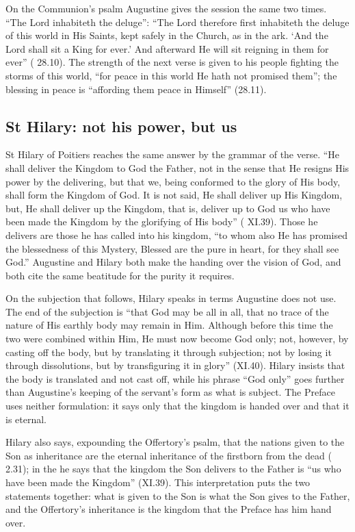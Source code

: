 On the Communion's psalm Augustine gives the session the same two times.
``The Lord inhabiteth the deluge'': ``The Lord therefore first inhabiteth the
deluge of this world in His Saints, kept safely in the Church, as in the ark.
`And the Lord shall sit a King for ever.' And afterward He will sit reigning in
them for ever'' ( 28.10). The strength of the
next verse is given to his people fighting the storms of this world, ``for
peace in this world He hath not promised them''; the blessing in peace is
``affording them peace in Himself'' (28.11).

\subsection{St Hilary: not his power, but us}
\label{sec:handed-hilary}

St Hilary of Poitiers reaches the same answer by the grammar of the verse.
``He shall deliver the Kingdom to God the Father, not in the sense that He
resigns His power by the delivering, but that we, being conformed to the glory
of His body, shall form the Kingdom of God. It is not said, He shall deliver up
His Kingdom, but, He shall deliver up the Kingdom, that is, deliver up to God
us who have been made the Kingdom by the glorifying of His body'' ( XI.39). Those he delivers are those he has called into his kingdom,
``to whom also He has promised the blessedness of this Mystery, Blessed are the
pure in heart, for they shall see God.'' Augustine and Hilary both
make the handing over the vision of God, and both cite the same beatitude for
the purity it requires.

On the subjection that follows, Hilary speaks in terms Augustine does not use.
The end of the subjection is ``that God may be all in all, that no trace of the
nature of His earthly body may remain in Him. Although before this time the two
were combined within Him, He must now become God only; not, however, by casting
off the body, but by translating it through subjection; not by losing it
through dissolutions, but by transfiguring it in glory'' (XI.40). Hilary insists
that the body is translated and not cast off, while his phrase ``God only'' goes
further than Augustine's keeping of the servant's form as what is subject.
The Preface uses neither formulation: it says only that the kingdom is handed
over and that it is eternal.

Hilary also says, expounding the Offertory's psalm, that the nations given to
the Son as inheritance are the eternal inheritance of the firstborn from the
dead ( 2.31); in the  he says
that the kingdom the Son delivers to the Father is ``us who have been made the
Kingdom'' (XI.39). This interpretation puts the two statements together: what is
given to the Son is what the Son gives to the Father, and the Offertory's
inheritance is the kingdom that the Preface has him hand over.

